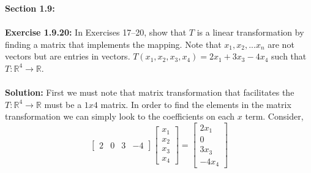 \documentclass{amsart}
\def\RR{{\mathbb R}}
\begin{document}
\thispagestyle{fancy}





{\huge\textbf{Section 1.9:}}\\\\
\noindent\textbf{Exercise 1.9.20: } In Exercises 17–20, show that $T$ is a linear transformation by finding a matrix that implements the mapping. Note that $x_1,x_2,...x_n$ are not vectors but are entries in vectors. $T(x_1,x_2,x_3,x_4) = 2x_1+ 3x_3 - 4x_4$ such that $T:\RR^{4} \to \RR$.\\\\
\noindent \textbf{Solution: } First we must note that matrix transformation that facilitates the $T:\RR^{4} \to \RR$ must be a $1x4$ matrix. In order to find the elements in the matrix transformation we can simply look to the coefficients on each $x$ term. Consider,
\begin{equation}
\begin{bmatrix}
2&0&3&-4
\end{bmatrix}
\begin{bmatrix}
x_1\\
x_2\\
x_3\\
x_4
\end{bmatrix}=
\begin{bmatrix}
2x_1\\
0\\
3x_3\\
-4x_4
\end{bmatrix}
\end{equation}
\vspace{1in}
\end{document}
